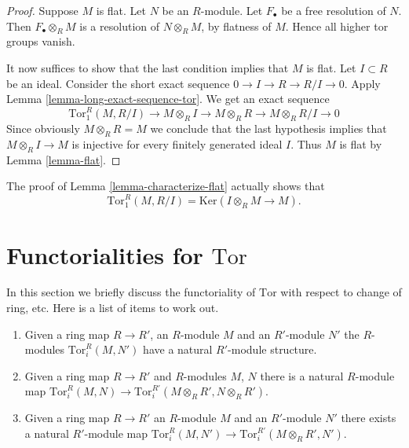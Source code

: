 \begin{proof}
Suppose $M$ is flat. Let $N$ be an $R$-module.
Let $F_\bullet$ be a free resolution of $N$.
Then $F_\bullet \otimes_R M$ is a resolution of $N\otimes_R M$,
by flatness of $M$. Hence all higher tor groups vanish.

\medskip\noindent
It now suffices to show that the last condition implies that
$M$ is flat. Let $I \subset R$ be an ideal.
Consider the short exact sequence
$0 \to I \to R \to R/I \to 0$. Apply
Lemma \ref{lemma-long-exact-sequence-tor}. We get an
exact sequence
$$
\text{Tor}_1^R(M, R/I) \to
M \otimes_R I \to
M \otimes_R R \to
M \otimes_R R/I \to
0
$$
Since obviously $M\otimes_R R = M$ we conclude that the
last hypothesis implies that $M \otimes_R I \to M$ is
injective for every finitely generated ideal $I$.
Thus $M$ is flat by Lemma \ref{lemma-flat}.
\end{proof}

\begin{remark}
\label{remark-Tor-ring-mod-ideal}
The proof of Lemma \ref{lemma-characterize-flat} actually shows
that
$$
\text{Tor}_1^R(M, R/I)
=
\text{Ker}(I \otimes_R M \to M).
$$
\end{remark}














\section{Functorialities for $\text{Tor}$}
\label{section-functoriality-tor}

\noindent
In this section we briefly discuss the functoriality
of $\text{Tor}$ with respect to change of ring, etc.
Here is a list of items to work out.
\begin{enumerate}
\item Given a ring map $R \to R'$, an $R$-module
$M$ and an $R'$-module $N'$
the $R$-modules $\text{Tor}_i^R(M, N')$ have
a natural $R'$-module structure.
\item Given a ring map $R \to R'$ and $R$-modules
$M$, $N$ there is a natural $R$-module map
$\text{Tor}_i^R(M, N) \to \text{Tor}_i^{R'}(M \otimes_R R', N\otimes_R R')$.
\item Given a ring map $R \to R'$ an $R$-module $M$ and
an $R'$-module $N'$ there exists a natural
$R'$-module map
$\text{Tor}_i^R(M, N') \to \text{Tor}_i^{R'}(M \otimes_R R', N')$.
\end{enumerate}

